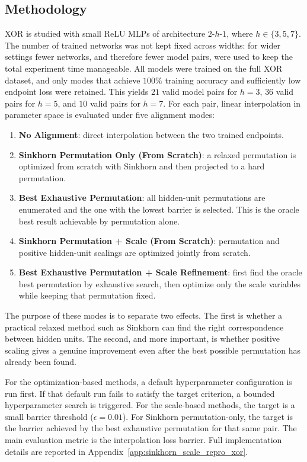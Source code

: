 \documentclass[11pt,a4paper]{report}
\begin{document}
\subsection{Methodology}
\label{subsec:xor_scale_methodology}

XOR is studied with small ReLU MLPs of architecture \(2\)-\(h\)-\(1\), where \(h \in \{3,5,7\}\). The number of trained networks was not kept fixed across widths: for wider settings fewer networks, and therefore fewer model pairs, were used to keep the total experiment time manageable. All models were trained on the full XOR dataset, and only modes that achieve \(100\%\) training accuracy and sufficiently low endpoint loss were retained. This yields \(21\) valid model pairs for \(h=3\), \(36\) valid pairs for \(h=5\), and \(10\) valid pairs for \(h=7\). For each pair, linear interpolation in parameter space is evaluated under five alignment modes:
\begin{enumerate}
    \item \textbf{No Alignment}: direct interpolation between the two trained endpoints.
    \item \textbf{Sinkhorn Permutation Only (From Scratch)}: a relaxed permutation is optimized from scratch with Sinkhorn and then projected to a hard permutation.
    \item \textbf{Best Exhaustive Permutation}: all hidden-unit permutations are enumerated and the one with the lowest barrier is selected. This is the oracle best result achievable by permutation alone.
    \item \textbf{Sinkhorn Permutation + Scale (From Scratch)}: permutation and positive hidden-unit scalings are optimized jointly from scratch.
    \item \textbf{Best Exhaustive Permutation + Scale Refinement}: first find the oracle best permutation by exhaustive search, then optimize only the scale variables while keeping that permutation fixed.
\end{enumerate}

The purpose of these modes is to separate two effects. The first is whether a practical relaxed method such as Sinkhorn can find the right correspondence between hidden units. The second, and more important, is whether positive scaling gives a genuine improvement even after the best possible permutation has already been found.

For the optimization-based methods, a default hyperparameter configuration is run first. If that default run fails to satisfy the target criterion, a bounded hyperparameter search is triggered. For the scale-based methods, the target is a small barrier threshold (\(\epsilon = 0.01\)). For Sinkhorn permutation-only, the target is the barrier achieved by the best exhaustive permutation for that same pair. The main evaluation metric is the interpolation loss barrier. Full implementation details are reported in Appendix~\ref{app:sinkhorn_scale_repro_xor}.
\end{document}
